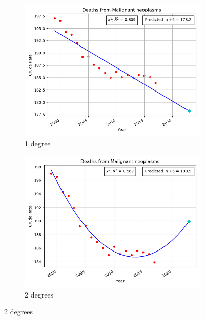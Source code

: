\documentclass[12pt, a4paper, twocolumn]{article}
\begin{document}
\begin{figure}
  \centering
  \begin{subfigure}[b]{0.4\textwidth}
    \includegraphics[width=\textwidth]{Malignant_neoplasms_1.png}
    \caption{1 degree}
    \label{fig:deg1}
  \end{subfigure}

  \begin{subfigure}[b]{0.4\textwidth}
    \includegraphics[width=\textwidth]{Malignant_neoplasms_2.png}
    \caption{2 degrees}
    \label{fig:deg2}
  \end{subfigure}


\end{figure}
\end{document}
